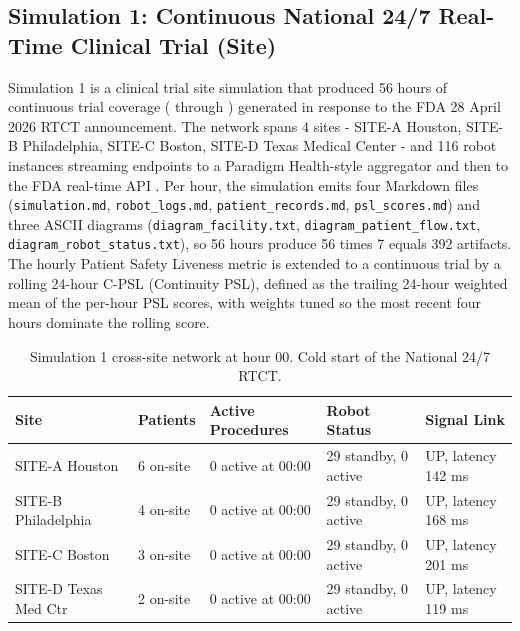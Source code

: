 
\subsection{Simulation 1: Continuous National 24/7 Real-Time Clinical Trial (Site)}
\label{sec:results-sim1}

Simulation 1 is a clinical trial site simulation that produced 56 hours
of continuous trial coverage ( through )
generated in response to the FDA 28 April 2026 RTCT announcement. The
network spans 4 sites - SITE-A Houston, SITE-B Philadelphia, SITE-C
Boston, SITE-D Texas Medical Center - and 116 robot instances streaming
endpoints to a Paradigm Health-style aggregator and then to the FDA
real-time API \cite{fda2026realtime, kawchak_2026_19176370,
kawchak_2026_19244918}. Per hour, the simulation emits four Markdown
files (\texttt{simulation.md}, \texttt{robot\_logs.md},
\texttt{patient\_records.md}, \texttt{psl\_scores.md}) and three ASCII
diagrams (\texttt{diagram\_facility.txt},
\texttt{diagram\_patient\_flow.txt},
\texttt{diagram\_robot\_status.txt}), so 56 hours produce 56 times 7
equals 392 artifacts. The hourly Patient Safety Liveness metric is
extended to a continuous trial by a rolling 24-hour C-PSL (Continuity
PSL), defined as the trailing 24-hour weighted mean of the per-hour
PSL scores, with weights tuned so the most recent four hours dominate
the rolling score.

\begin{table}[H]
\centering
\caption{Simulation 1 cross-site network at hour 00. Cold start of the
National 24/7 RTCT.}
\label{tab:sim1-hour00-network}
\begin{tabular}{L{2.1cm} L{2.4cm} L{3.1cm} L{3.6cm} L{3.3cm}}
\toprule
\textbf{Site} & \textbf{Patients} & \textbf{Active Procedures} & \textbf{Robot Status} & \textbf{Signal Link} \\
\midrule
SITE-A Houston      & 6 on-site & 0 active at 00:00 & 29 standby, 0 active & UP, latency 142 ms \\
SITE-B Philadelphia & 4 on-site & 0 active at 00:00 & 29 standby, 0 active & UP, latency 168 ms \\
SITE-C Boston       & 3 on-site & 0 active at 00:00 & 29 standby, 0 active & UP, latency 201 ms \\
SITE-D Texas Med Ctr & 2 on-site & 0 active at 00:00 & 29 standby, 0 active & UP, latency 119 ms \\
\bottomrule
\end{tabular}
\end{table}


